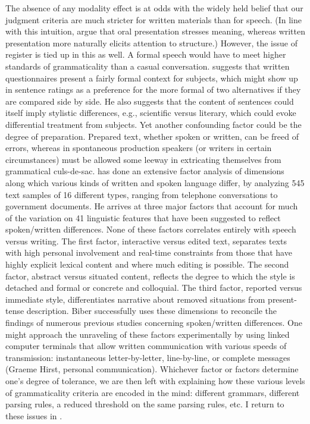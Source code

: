 The absence of any modality effect is at odds with the widely held belief that our judgment criteria are much stricter for written materials than for speech. (In line with this intuition, \citet{BialystokEtAl1985} argue that oral presentation stresses meaning, whereas written presentation more naturally elicits attention to structure.) However, the issue of register is tied up in this as well. A formal speech would have to meet higher standards of grammaticality than a casual conversation. \citet{Greenbaum1977b} suggests that written questionnaires present a fairly formal context for subjects, which might show up in sentence ratings  as a preference for the more formal of two alternatives if they are compared side by side. He also suggests \citep{Greenbaum1977c}
that the content of sentences could itself imply stylistic differences, e.g., scientific versus literary, which could evoke differential treatment from subjects. Yet another confounding factor could be the degree of preparation. Prepared text, whether spoken or written, can be freed of errors, whereas in spontaneous production speakers (or writers in certain circumstances) must be allowed some leeway in extricating themselves from grammatical culs-de-sac. \citet{Biber1986} has done an extensive factor analysis of dimensions along which various kinds of written and spoken language differ, by analyzing 545 text samples of 16
different types, ranging from telephone conversations to government documents. He arrives at three major factors that account for much of the variation on 41 linguistic features that have been suggested to reflect spoken/written differences. None of these factors correlates entirely with speech versus writing. The first factor, interactive versus edited text, separates texts with high personal involvement and real-time constraints from those that have highly explicit lexical content and where much editing is possible. The second factor, abstract versus situated content, reflects the degree to which the style is detached and formal or concrete and colloquial. The third factor, reported versus immediate style, differentiates narrative about removed situations from present-tense description. Biber successfully uses these dimensions to reconcile the findings of numerous previous studies concerning spoken/written differences. One might approach the unraveling of these factors experimentally by using linked computer terminals that allow written communication with various speeds of transmission: instantaneous letter-by-letter, line-by-line, or complete messages (Graeme Hirst, personal communication). Whichever factor or factors determine one's degree of tolerance, we are then left with explaining how these various levels of grammaticality criteria are encoded in the mind: different grammars, different parsing rules, a reduced threshold on the same parsing rules, etc. I return to these issues in .

